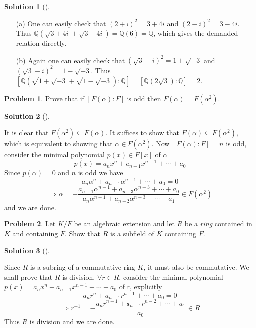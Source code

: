 \documentclass{article}
\theoremstyle{definition}
\newtheorem{prob}{Problem}
\newtheorem*{sol}{Solution}
\newenvironment{sols}[1][]{%
  \begin{sol}[#1]$ $\par\nobreak\ignorespaces
}{%
  \end{sol}
}
\begin{document}
\begin{sols}
	\begin{enumerate}
		\item[(a)] One can easily check that $(2 + i)^2 = 3 + 4i$ and $(2 - i)^2 = 3 - 4i$.
			Thus $\mathbb{Q}(\sqrt{3 + 4i} + \sqrt{3 - 4i})=  \mathbb{Q}(6) = \mathbb{Q}$, which gives the demanded relation directly.

		\item[(b)] Again one can easily check that $(\sqrt{3} - i)^2 = 1 + \sqrt{-3}$ and $(\sqrt{3} - i)^2 = 1 - \sqrt{-3}$.
			Thus $[\mathbb{Q}(\sqrt{1 + \sqrt{-3}} + \sqrt{1 - \sqrt{-3}}): \mathbb{Q}] = [\mathbb{Q}(2 \sqrt{3}) : \mathbb{Q}] = 2$.
	\end{enumerate}
\end{sols}

\setcounter{prob}{13}
\begin{prob}
	Prove that if $[F(\alpha) : F]$ is odd then $F(\alpha) = F(\alpha^2)$.
\end{prob}

\begin{sols}
	It is clear that $F(\alpha^2) \subseteq F(\alpha)$.
	It suffices to show that $F(\alpha) \subseteq F(\alpha^2)$, which is equivalent to showing that $\alpha \in F(\alpha^2)$.
	Now $[F(\alpha):F] = n$ is odd, consider the minimal polynomial $p(x) \in F[x]$ of $\alpha$
	\[
		p(x) = a_n x^n + a_{n - 1} x^{n - 1} + \cdots + a_0
	\]
	Since $p(\alpha) = 0$ and $n$ is odd we have
	\[
		a_n \alpha^n + a_{n - 1} \alpha^{n - 1} + \cdots + a_0 = 0
	\]
	\[
		\Rightarrow \alpha = -\frac{a_{n - 1} \alpha^{n - 1} + a_{n - 3} \alpha^{n - 3} + \cdots + a_0}{a_n \alpha^{n - 1} + a_{n - 2} \alpha^{n - 3} + \cdots + a_1} \in F(\alpha^2)
	\]
	and we are done.
\end{sols}

\setcounter{prob}{15}
\begin{prob}
	Let $K/F$ be an algebraic extension and let $R$ be a \textit{ring} contained in $K$ and containing $F$.
	Show that $R$ is a subfield of $K$ containing $F$.
\end{prob}

\begin{sols}
	Since $R$ is a subring of a commutative ring $K$, it must also be commutative. 
	We shall prove that $R$ is division.
	$\forall r \in R$, consider the minimal polynomial $p(x) = a_n x^n + a_{n - 1} x^{n - 1} + \cdots + a_0$ of $r$, explicitly
	\[
		a_n r^n + a_{n - 1} r^{n - 1} + \cdots + a_0 = 0
	\]
	\[
		\Rightarrow r^{-1} = -\frac{a_n r^{n - 1} + a_{n - 1} r^{n - 2} + \cdots + a_1}{a_0} \in R
	\]
	Thus $R$ is division and we are done.
\end{sols}
\end{document}
